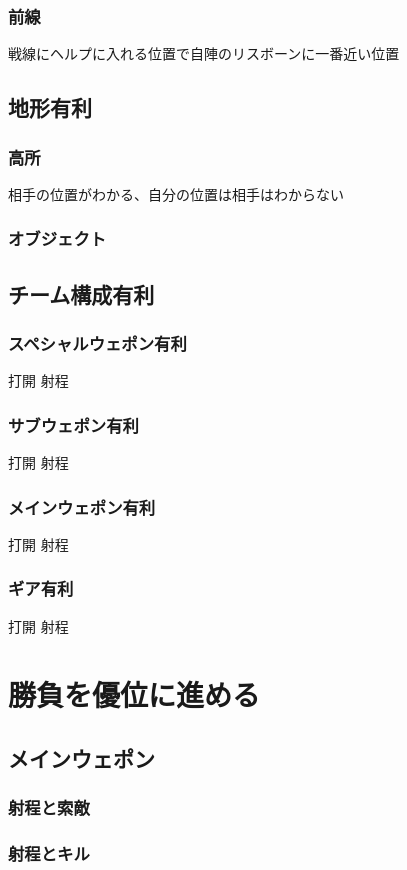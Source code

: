 \documentclass[a4paper,11pt]{jsbook}
\begin{document}
\subsection{前線}
戦線にヘルプに入れる位置で自陣のリスボーンに一番近い位置

\section{地形有利}
\subsection{高所}
相手の位置がわかる、自分の位置は相手はわからない

\subsection{オブジェクト}
\section{チーム構成有利}
\subsection{スペシャルウェポン有利}
打開
射程
\subsection{サブウェポン有利}
打開
射程
\subsection{メインウェポン有利}
打開
射程
\subsection{ギア有利}
打開
射程

\chapter{勝負を優位に進める}
\section{メインウェポン}
\subsection{射程と索敵}
\subsection{射程とキル}
\end{document}
